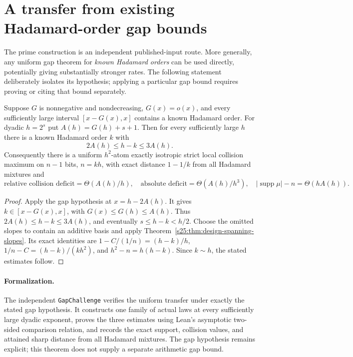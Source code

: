 \section{A transfer from existing Hadamard-order gap bounds}
\label{s27:sec:stability-hadamard-gap-transfer}
The prime construction is an independent published-input route. More
generally, any uniform gap theorem for \emph{known Hadamard orders}
can be used directly, potentially giving substantially stronger rates.
The following statement deliberately isolates its hypothesis; applying a
particular gap bound requires proving or citing that bound separately.

\begin{theorem}
\label{s27:thm:stability-hadamard-gap-transfer}
Suppose $G$ is nonnegative and nondecreasing, $G(x)=o(x)$, and every
sufficiently large interval $[x-G(x),x]$ contains a known Hadamard order.
For dyadic $h=2^s$ put $A(h)=G(h)+s+1$. Then for every sufficiently large
$h$ there is a known Hadamard order $k$ with
\[
 2A(h)\le h-k\le3A(h).
\]
Consequently there is a uniform $h^2$-atom exactly isotropic strict local
collision maximum on $n-1$ bits, $n=kh$, with exact distance $1-1/k$
from all Hadamard mixtures and
\[
 \text{relative collision deficit}=\Theta(A(h)/h),\quad
 \text{absolute deficit}=\Theta(A(h)/h^3),\quad
 |\operatorname{supp}\mu|-n=\Theta(hA(h)).
\]
\end{theorem}
\begin{proof}
Apply the gap hypothesis at $x=h-2A(h)$. It gives
$k\in[x-G(x),x]$, with $G(x)\le G(h)\le A(h)$.
Thus $2A(h)\le h-k\le3A(h)$, and eventually
$s\le h-k<h/2$. Choose the omitted slopes to contain an additive basis
and apply Theorem~\ref{s25:thm:design-spanning-slopes}. Its exact identities
are $1-C/(1/n)=(h-k)/h$, $1/n-C=(h-k)/(kh^2)$, and
$h^2-n=h(h-k)$. Since $k\sim h$, the stated estimates follow.
\end{proof}

\paragraph{Formalization.}
The independent \texttt{GapChallenge} verifies the uniform transfer
under exactly the stated gap hypothesis. It constructs one family of
actual laws at every sufficiently large dyadic exponent, proves the
three estimates using Lean's asymptotic two-sided comparison relation,
and records the exact support, collision values, and attained sharp
distance from all Hadamard mixtures. The gap hypothesis remains explicit;
this theorem does not supply a separate arithmetic gap bound.

